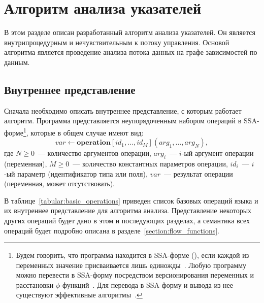 \documentclass[14pt,titlepage,draft]{extarticle}
\newcommand{\java}{\eng{Java}\xspace}
\let\mathphi\phi
\renewcommand{\phi}{\ensuremath{\mathphi}}
\newcommand{\op}[1]{\mathbf{#1}}
\begin{document}
  \section{Алгоритм анализа указателей}

    В этом разделе описан разработанный алгоритм анализа указателей. Он является
    внутрипроцедурным и нечувствительным к потоку управления. Основой алгоритма
    является проведение анализа потока данных на графе зависимостей по данным.

  \subsection{Внутреннее представление}
    \label{section:ir_ops}

    Сначала необходимо описать внутреннее представление, с которым работает
    алгоритм. Программа представляется неупорядоченным набором операций в
    SSA-форме\footnote{
      Будем говорить, что программа находится в SSA-форме (), если каждой из переменных значение присваивается лишь
      единожды~\cite{ssa}.
      Любую программу можно перевести в SSA-форму посредством
      версионирования переменных и расстановки \phi-функций~\cite{ssa}.
      Для перевода в SSA-форму и вывода из нее существуют эффективные
      алгоритмы~\cite{bilardi_ssa, briggs_ssa}.
    }, которые в общем случае имеют вид:
    \[ var \gets \op{operation}[id_1, \ldots, id_M](arg_1, \ldots, arg_N), \]
    где
    $N \geq 0$~--- количество аргументов операции,
    $arg_i$~--- $i$-ый аргумент операции (переменная),
    $M \geq 0$~--- количество константных параметров операции,
    $id_i$~--- $i$-ый параметр (идентификатор типа или поля),
    $var$~--- результат операции (переменная, может отсутствовать).

    В таблице~\ref{tabular:basic_operations} приведен список базовых операций
    языка \java и их внутреннее представление для алгоритма анализа.
    Представление некоторых других операций будет дано в этом и последующих
    разделах, а семантика всех операций будет подробно описана в
    разделе~\ref{section:flow_functions}.
\end{document}
